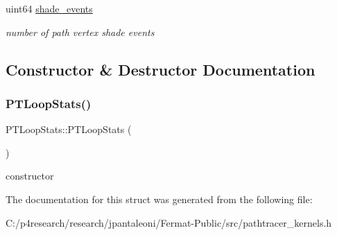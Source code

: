 \begin{DoxyCompactItemize}
\mbox{\label{struct_p_t_loop_stats_a0373e4feb7b3a945368b29e2ad43d2fa}} 
uint64 \hyperlink{struct_p_t_loop_stats_a0373e4feb7b3a945368b29e2ad43d2fa}{shade\+\_\+events}
\begin{DoxyCompactList}\small\item\em number of path vertex shade events \end{DoxyCompactList}\end{DoxyCompactItemize}


\subsection{Constructor \& Destructor Documentation}
\mbox{\label{struct_p_t_loop_stats_a5b8c04577ddcc4d68863d5dc35bffa47}} 
\subsubsection{\texorpdfstring{P\+T\+Loop\+Stats()}{PTLoopStats()}}
{\footnotesize\ttfamily P\+T\+Loop\+Stats\+::\+P\+T\+Loop\+Stats (\begin{DoxyParamCaption}{ }\end{DoxyParamCaption})\hspace{0.3cm}{\ttfamily [inline]}}

constructor 

The documentation for this struct was generated from the following file\+:\begin{DoxyCompactItemize}
\item 
C\+:/p4research/research/jpantaleoni/\+Fermat-\/\+Public/src/pathtracer\+\_\+kernels.\+h\end{DoxyCompactItemize}
